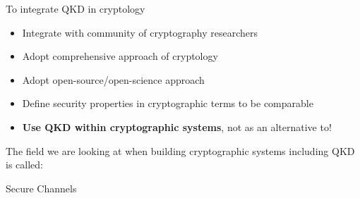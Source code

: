 \begin{frame}{To integrate QKD in cryptology}
  \small
  \begin{itemize}
    \item Integrate with community of cryptography researchers
    \item Adopt comprehensive approach of cryptology
    \item Adopt open-source/open-science approach
    \item Define security properties in cryptographic terms to be comparable
    \item \textbf{Use QKD within cryptographic systems}, not as an alternative to!
  \end{itemize}

  The field we are looking at when building cryptographic systems including QKD is called:

  \centering\large Secure Channels
\end{frame}
